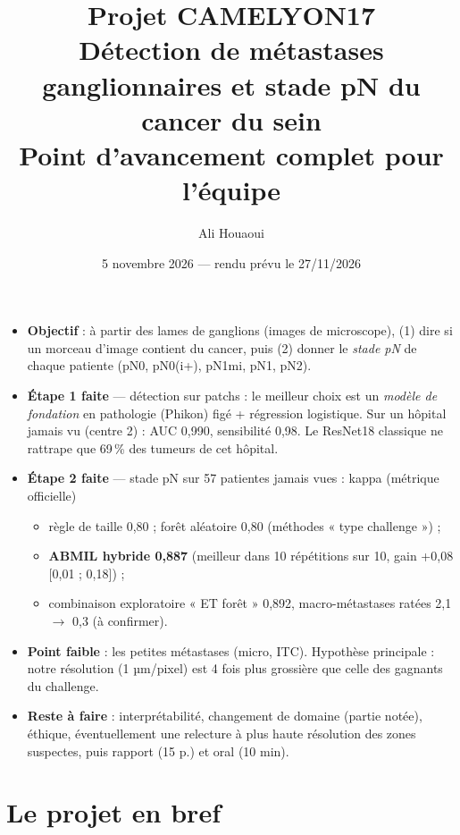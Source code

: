 \documentclass[11pt,a4paper]{article}
\title{\vspace{-1.2cm}\textbf{\color{bleu}Projet CAMELYON17}\\[4pt]
\large Détection de métastases ganglionnaires et stade pN du cancer du sein\\[2pt]
\normalsize Point d'avancement complet pour l'équipe}
\author{Ali Houaoui}
\date{5 novembre 2026 — rendu prévu le 27/11/2026}
\begin{document}
\maketitle
\thispagestyle{fancy}

\begin{resume}
\begin{itemize}
  \item \textbf{Objectif} : à partir des lames de ganglions (images de microscope), (1) dire si un morceau d'image
        contient du cancer, puis (2) donner le \emph{stade pN} de chaque patiente (pN0, pN0(i+), pN1mi, pN1, pN2).
  \item \textbf{Étape 1 faite} — détection sur patchs : le meilleur choix est un \emph{modèle de fondation} en
        pathologie (Phikon) figé + régression logistique. Sur un hôpital jamais vu (centre 2) : AUC 0,990,
        sensibilité 0,98. Le ResNet18 classique ne rattrape que 69\,\% des tumeurs de cet hôpital.
  \item \textbf{Étape 2 faite} — stade pN sur 57 patientes jamais vues : kappa (métrique officielle)
        \begin{itemize}
          \item règle de taille 0,80 ; forêt aléatoire 0,80 (méthodes « type challenge ») ;
          \item \textbf{ABMIL hybride 0,887} (meilleur dans 10 répétitions sur 10, gain +0,08 [0,01 ; 0,18]) ;
          \item combinaison exploratoire « ET forêt » 0,892, macro-métastases ratées 2,1 $\to$ 0,3 (à confirmer).
        \end{itemize}
  \item \textbf{Point faible} : les petites métastases (micro, ITC). Hypothèse principale : notre résolution
        (1 µm/pixel) est 4 fois plus grossière que celle des gagnants du challenge.
  \item \textbf{Reste à faire} : interprétabilité, changement de domaine (partie notée), éthique, éventuellement une
        relecture à plus haute résolution des zones suspectes, puis rapport (15 p.) et oral (10 min).
\end{itemize}
\end{resume}

\tableofcontents
\newpage

\section{Le projet en bref}
\end{document}
